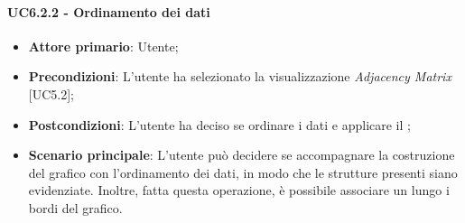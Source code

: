 \paragraph{UC6.2.2 - Ordinamento dei dati}
\begin{itemize}
	\item \textbf{Attore primario}: Utente;
	\item \textbf{Precondizioni}: L'utente ha selezionato la visualizzazione \textit{Adjacency Matrix} [UC5.2];
	\item \textbf{Postcondizioni}: L'utente ha deciso se ordinare i dati e applicare il ;
	
	\item \textbf{Scenario principale}: L'utente può decidere se accompagnare la costruzione del grafico con l'ordinamento dei dati, in modo che le strutture presenti siano evidenziate. Inoltre, fatta questa operazione, è possibile associare un  lungo i bordi del grafico.
\end{itemize}